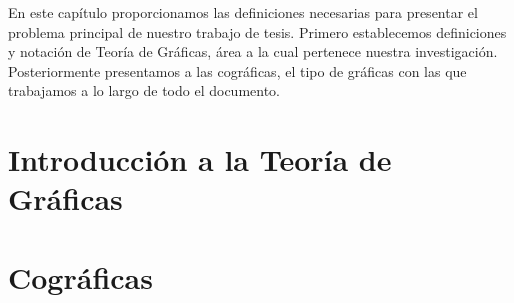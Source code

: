 En este capítulo proporcionamos las definiciones necesarias para presentar el problema principal de nuestro trabajo de tesis. Primero establecemos definiciones y notación de Teoría de Gráficas, área a la cual pertenece nuestra investigación. Posteriormente presentamos a las cográficas, el tipo de gráficas con las que trabajamos a lo largo de todo el documento.


\section{Introducción a la Teoría de Gráficas}
    
    

\section{Cográficas}
    

